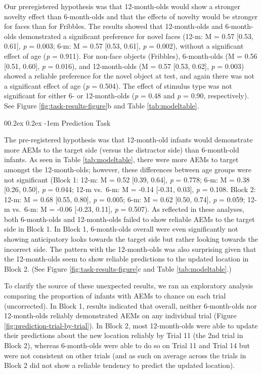 \documentclass[
  english,
  man,floatsintext]{apa6}
\makeatletter
\let\oldparagraph\paragraph
\renewcommand{\paragraph}{
    \@ifstar
      \xxxParagraphStar
      \xxxParagraphNoStar
  }
\newcommand{\xxxParagraphStar}[1]{\oldparagraph*{#1}\mbox{}}
\newcommand{\xxxParagraphNoStar}[1]{\oldparagraph{#1}\mbox{}}
\renewcommand{\paragraph}{\@startsection{paragraph}{4}{\parindent}%
  {0\baselineskip \@plus 0.2ex \@minus 0.2ex}%
  {-1em}%
  {\normalfont\normalsize\bfseries\itshape\typesectitle}}
\makeatother
\begin{document}
Our preregistered hypothesis was that 12-month-olds would show a stronger novelty effect than 6-month-olds and that the effects of novelty would be stronger for faces than for Fribbles.
The results showed that 12-month-olds and 6-month-olds demonstrated a significant preference for novel faces (12-m: M = 0.57 {[}0.53, 0.61{]}, \emph{p} = 0.003; 6-m: M = 0.57 {[}0.53, 0.61{]}, \emph{p} = 0.002), without a significant effect of age (\emph{p} = 0.911).
For non-face objects (Fribbles), 6-month-olds (M = 0.56 {[}0.51, 0.60{]}, \emph{p} = 0.016), and 12-month-olds (M = 0.57 {[}0.53, 0.62{]}, \emph{p} = 0.003) showed a reliable preference for the novel object at test, and again there was not a significant effect of age (\emph{p} = 0.504).
The effect of stimulus type was not significant for either 6- or 12-month-olds (\emph{p} = 0.48 and \emph{p} = 0.90, respectively).
See Figure \ref{fig:task-results-figure}b and Table \ref{tab:modeltable}.

\paragraph{Prediction Task}\label{prediction-task}

The pre-registered hypothesis was that 12-month-old infants would demonstrate more AEMs to the target side (versus the distractor side) than 6-month-old infants.
As seen in Table \ref{tab:modeltable}, there were more AEMs to target amongst the 12-month-olds; however, these differences between age groups were not significant (Block 1: 12-m: M = 0.52 {[}0.39, 0.64{]}, \emph{p} = 0.778; 6-m: M = 0.38 {[}0.26, 0.50{]}, \emph{p} = 0.044; 12-m vs.~6-m: M = -0.14 {[}-0.31, 0.03{]}, \emph{p} = 0.108.
Block 2: 12-m: M = 0.68 {[}0.55, 0.80{]}, \emph{p} = 0.005; 6-m: M = 0.62 {[}0.50, 0.74{]}, \emph{p} = 0.059; 12-m vs.~6-m: M = -0.06 {[}-0.23, 0.11{]}, \emph{p} = 0.507).
As reflected in these analyses, both 6-month-olds and 12-month-olds failed to show reliable AEMs to the target side in Block 1.
In Block 1, 6-month-olds overall were even significantly not showing anticipatory looks towards the target side but rather looking towards the incorrect side.
The pattern with the 12-month-olds was also surprising given that the 12-month-olds seem to show reliable predictions to the updated location in Block 2.
(See Figure \ref{fig:task-results-figure}c and Table \ref{tab:modeltable}.)

To clarify the source of these unexpected results, we ran an exploratory analysis comparing the proportion of infants with AEMs to chance on each trial (uncorrected).
In Block 1, results indicated that overall, neither 6-month-olds nor 12-month-olds reliably demonstrated AEMs on any individual trial (Figure \ref{fig:prediction-trial-by-trial}).
In Block 2, most 12-month-olds were able to update their predictions about the new location reliably by Trial 11 (the 2nd trial in Block 2), whereas 6-month-olds were able to do so on Trial 11 and Trial 14 but were not consistent on other trials (and as such on average across the trials in Block 2 did not show a reliable tendency to predict the updated location).
\end{document}
